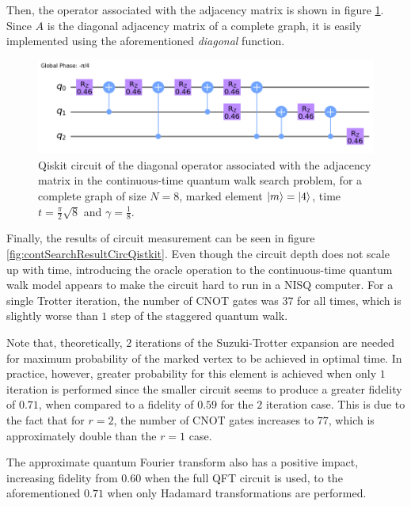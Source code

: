 \documentclass[../../dissertation.tex]{subfiles}
\begin{document}
Then, the operator associated with the adjacency matrix is shown in figure
\ref{fig:contSearchAdjCircQistkit}. Since $A$ is the diagonal adjacency matrix
of a complete graph, it is easily implemented using the aforementioned
\textit{diagonal} function.\par
\begin{figure}[!h]
	\centering
	\includegraphics[scale=0.30]{img/Qiskit/ContQuantumWalk/Search/Circuits/circAjd_N3_S2.png}
	\caption{Qiskit circuit of the  diagonal operator associated with the adjacency matrix in the continuous-time quantum walk search problem, for a complete graph of size $N=8$, marked element $\ket{m}=\ket{4}$, time $t=\frac{\pi}{2} \sqrt{8}$ and $\gamma = \frac{1}{8}$.}
	\label{fig:contSearchAdjCircQistkit}
\end{figure}
Finally, the results of circuit measurement can be seen in figure
\ref{fig:contSearchResultCircQistkit}. Even though the circuit depth does not
scale up with time, introducing the oracle operation to the continuous-time
quantum walk model appears to make the circuit hard to run in a NISQ computer. For a single Trotter iteration, the number of CNOT gates was $37$ for all times, which is slightly worse than $1$ step of the staggered quantum walk.\par
Note that, theoretically, $2$ iterations of the Suzuki-Trotter expansion are
needed for maximum probability of the marked vertex to be achieved in optimal
time.  In practice, however, greater probability for this element is achieved
when only $1$ iteration is performed since the smaller circuit seems to produce
a greater fidelity of $0.71$, when compared to a fidelity of $0.59$ for the $2$
iteration case. This is due to the fact that for $r=2$, the number of CNOT gates increases to $77$, which is approximately double than the $r=1$ case.\par
The approximate quantum Fourier transform also has a positive
impact, increasing fidelity from $0.60$ when the full QFT circuit is used, to
the aforementioned $0.71$ when only Hadamard transformations are performed.
\end{document}
